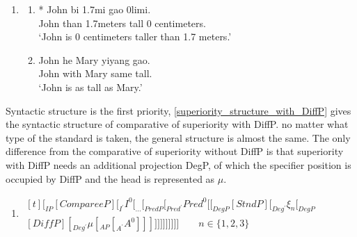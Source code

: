 \documentclass{ctexart}
\begin{document}
\begin{enumerate}
    \item \label{superiority_example_9}
    \begin{enumerate}
        \item \label{superiority_example_9_a}
        * John bi 1.7mi gao 0limi. \\
        \hspace*{0.5em} John than 1.7meters tall 0 centimeters. \\
        \hspace*{0.5em} `John is 0 centimeters taller than 1.7 meters.'

        \item \label{superiority_example_9_b}
        John he Mary yiyang gao. \\
        John with Mary same tall.  \\
        `John is as tall as Mary.'

    \end{enumerate}
\end{enumerate}

Syntactic structure is the first priority, \ref{superiority_structure_with_DiffP} gives the syntactic structure of comparative of superiority with DiffP. no matter what type of the standard is taken, the general structure is almost the same. The only difference from the comparative of superiority without DiffP is that superiority with DiffP needs an additional projection DegP, of which the specifier position is occupied by DiffP and the head is represented as $\mu$.

\begin{enumerate}
    \item \label{superiority_structure_with_DiffP}
    $\begin{aligned}[t]
        [_{IP} [CompareeP] [_{I^{\prime}} I^{0} [_{...} [_{PredP} [_{Pred^{\prime}} Pred^0 [[_{DegP} [StndP] [_{Deg^{\prime}} \xi_{n} [_{DegP} \\ [DiffP] [_{Deg^{\prime}} \mu [_{AP} [_{A^{\prime}} A^{0}]]]]]]]]]]]] 
        \qquad n \in \{1, 2, 3\}
    \end{aligned}$
\end{enumerate}
\end{document}
